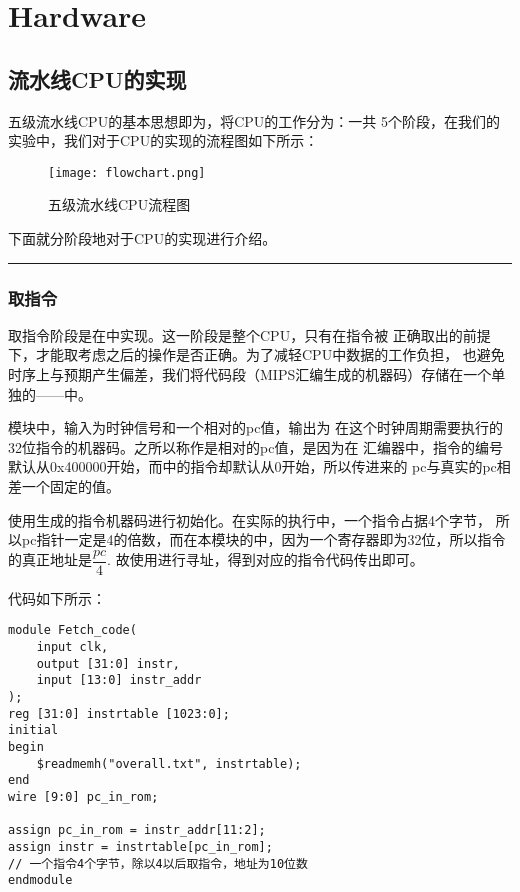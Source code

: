 \chapter{Hardware}
\section{流水线CPU的实现}
\kaishu
\hspace*{5mm}五级流水线CPU的基本思想即为，将CPU的工作分为：一共
5个阶段，在我们的实验中，我们对于CPU的实现的流程图如下所示：
\begin{figure}[htbp]
    \centering
    \caption{五级流水线CPU流程图}
    \texttt{[image: flowchart.png]}
\end{figure}
\songti
下面就分阶段地对于CPU的实现进行介绍。

\rule[-10pt]{14.3cm}{0.05em}
\subsection{取指令}
\hspace*{5mm}取指令阶段是在中实现。这一阶段是整个CPU，只有在指令被
正确取出的前提下，才能取考虑之后的操作是否正确。为了减轻CPU中数据的工作负担，
也避免时序上与预期产生偏差，我们将代码段（MIPS汇编生成的机器码）存储在一个单独的——中。

\kaishu
{}模块中，输入为时钟信号和一个相对的pc值，输出为
在这个时钟周期需要执行的32位指令的机器码。之所以称作是相对的pc值，是因为在
汇编器中，指令的编号默认从0x400000开始，而中的指令却默认从0开始，所以传进来的
pc与真实的pc相差一个固定的值。

使用生成的指令机器码进行初始化。在实际的执行中，一个指令占据4个字节，
所以pc指针一定是4的倍数，而在本模块的中，因为一个寄存器即为32位，所以指令的真正地址是$\dfrac{pc}{4}$.
故使用进行寻址，得到对应的指令代码传出即可。

代码如下所示：
\begin{lstlisting}[style = verilog-style, caption={module Fetch\_code}]
module Fetch_code(
    input clk,
    output [31:0] instr,
    input [13:0] instr_addr
);
reg [31:0] instrtable [1023:0];
initial 
begin
    $readmemh("overall.txt", instrtable);
end
wire [9:0] pc_in_rom;

assign pc_in_rom = instr_addr[11:2];
assign instr = instrtable[pc_in_rom]; 
// 一个指令4个字节，除以4以后取指令，地址为10位数
endmodule

\end{lstlisting}
